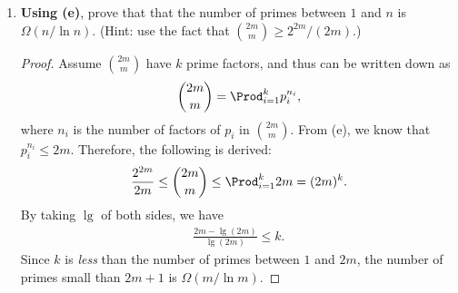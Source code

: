 \documentclass[11pt]{article}
\begin{document}
\begin{enumerate}
\begin{enumerate}
\begin{proof}
            So, we are left with the case that $p$ divides
            $2\beta+1$ (which implies that $p>2$). But then,
            $p$ can not possibly divide $\beta+1$ and
            $2(\beta+1)$, and furthermore, we know that $p^k
            | B(m,p)$. Thus,
            \[
            \beta = 2B(m,p) = \frac{2p(\beta+1)}{p(\beta+1)}
            B(m,p) = p(\beta+1) \binom{2(\beta+1)}{\beta+1}.
            \]
            Now, we know that $p^k | \beta$, which implies
            by induction that $p^k \leq 2 (\beta+1)p$. Which
            is not good enough, as this is larger than the
            bound we require.
            
            Well, just a little bit more patience. If $k=1$,
            the claim trivially hold (as one can easily
            verify). So, we can assume that $k >1$. But then
            we are dealing with the case that $p |
            2\beta+1$. Thus, $p^k \leq (2\beta+1)p + p$.
            However, $p^2$ divides the left side of this
            inequality, but not the right side of this
            inequality ($p^2 | p^k$ since $k>1$ and $p^2 |
            (2\beta+1)p$ since $p | 2\beta+1$). It follows
            that $p^k < (2\beta+1)p + p$. Namely, $p^k \leq
            (2\beta +1)p \leq 2m$.
  
            And we are FINALLY done. (I am sure BTW that
            there is a much shorter solution. This is a
            solution I could come up with.)
        \end{proof}
        
        \item {} \textbf{Using (e)}, prove that that
        the number of primes between $1$ and $n$ is
        $\Omega(n /\ln n)$.  (Hint: use the fact that
        $\binom{2m}{m} \geq 2^{2m}/(2m)$.)
        \begin{proof}
            Assume $2m\choose{m}$ have $k$ prime factors,
            and thus can be written down as
            \begin{eqnarray*}
                {2m\choose{m}} = \Prod_{i=1}^k{p_i^{n_i}},
            \end{eqnarray*}
            where $n_i$ is the number of factors of $p_i$ in
            $2m\choose{m}$. From (e), we know that $p_i^{n_i} \le
            2m$. Therefore, the following is derived:
            \begin{eqnarray*}
                \frac{2^{2m}}{2m} \le {2m\choose{m}} \le 
                \Prod_{i=1}^k{2m} = (2m)^k.
            \end{eqnarray*}
            By taking $\lg$ of both sides, we have
            \begin{eqnarray*}
                \frac{2m - \lg(2m)}{\lg(2m)} \leq k.
            \end{eqnarray*}
            Since $k$ is \emph{less} than the number of
            primes between $1$ and $2m$, the number of
            primes small than $2m+1$ is
            $\Omega(m/\ln{m})$.
        \end{proof}
    \end{enumerate}
    

\end{enumerate}
\end{document}
